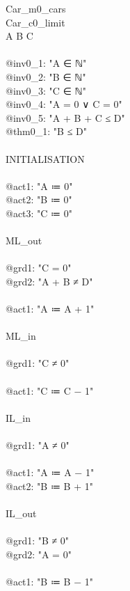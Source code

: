 \begin{description}
	\begin{center}
		\begin{Bcode}
			\ifplastex
			\Bmachine{} Car\_m0_cars\\
			\Bsees{} Car\_c0_limit\\
			\Bvariables{} A B C\\
			\Binvariants\\
			@inv0_1: "A ∈ ℕ"\\
			@inv0_2: "B ∈ ℕ"\\
			@inv0_3: "C ∈ ℕ"\\
			@inv0_4: "A = 0 ∨ C = 0"\\
			@inv0_5: "A + B + C ≤ D"\\
			@thm0_1: "B ≤ D" \Btheorem\\
			\Bevents\\
			INITIALISATION\\
			\Bbegin\\
			@act1: "A ≔ 0"\\
			@act2: "B ≔ 0"\\
			@act3: "C ≔ 0"\\
			\Bend\\
			ML_out\\
			\Bwhen\\
			@grd1: "C = 0"\\
			@grd2: "A + B ≠ D"\\
			\Bthen\\
			@act1: "A ≔ A + 1"\\
			\Bend\\
			ML_in\\
			\Bwhen\\
			@grd1: "C ≠ 0"\\
			\Bthen\\
			@act1: "C ≔ C − 1"\\
			\Bend\\
			IL_in\\
			\Bwhen\\
			@grd1: "A ≠ 0"\\
			\Bthen\\
			@act1: "A ≔ A − 1"\\
			@act2: "B ≔ B + 1"\\
			\Bend\\
			IL_out\\
			\Bwhen\\
			@grd1: "B ≠ 0"\\
			@grd2: "A = 0"\\
			\Bthen\\
			@act1: "B ≔ B − 1"\\

\end{Bcode}
\end{center}
\end{description}
